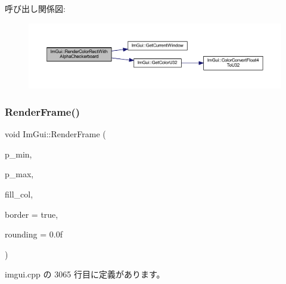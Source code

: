 呼び出し関係図\+:\nopagebreak
\begin{figure}[H]
\begin{center}
\leavevmode
\includegraphics[width=350pt]{namespace_im_gui_a4715686ee0c613e8518c0f5e92c358ce_cgraph}
\end{center}
\end{figure}
\mbox{\label{namespace_im_gui_a621ba649568ede3939d4f10d83b86d04}} 
\subsubsection{\texorpdfstring{Render\+Frame()}{RenderFrame()}}
{\footnotesize\ttfamily void Im\+Gui\+::\+Render\+Frame (\begin{DoxyParamCaption}\item[{\mbox{\hyperlink{struct_im_vec2}{Im\+Vec2}}}]{p\+\_\+min,  }\item[{\mbox{\hyperlink{struct_im_vec2}{Im\+Vec2}}}]{p\+\_\+max,  }\item[{\mbox{\hyperlink{imgui_8h_a118cff4eeb8d00e7d07ce3d6460eed36}{Im\+U32}}}]{fill\+\_\+col,  }\item[{bool}]{border = {\ttfamily true},  }\item[{float}]{rounding = {\ttfamily 0.0f} }\end{DoxyParamCaption})}



 imgui.\+cpp の 3065 行目に定義があります。

